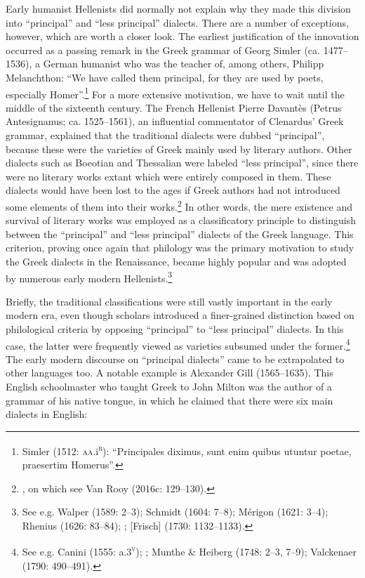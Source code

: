 \documentclass[output=paper]{langsci/langscibook}
\begin{document}
Early humanist Hellenists did normally not explain why they made this division into “principal” and “less principal” dialects. There are a number of exceptions, however, which are worth a closer look. The earliest justification of the innovation occurred as a passing remark in the Greek grammar of Georg Simler (ca. 1477–1536), a German humanist who was the teacher of, among others, Philipp Melanchthon: “We have called them principal, for they are used by poets, especially Homer”.\footnote{Simler (1512: \textsc{aa.}i\textsc{\textsuperscript{r}}): “Principales diximus, sunt enim quibus utuntur poetae, praesertim Homerus”.} For a more extensive motivation, we have to wait until the middle of the sixteenth century. The French Hellenist Pierre Davantès (Petrus Antesignanus; ca. 1525–1561), an influential commentator of Clenardus’ Greek grammar, explained that the traditional dialects were dubbed “principal”, because these were the varieties of Greek mainly used by literary authors. Other dialects such as Boeotian and Thessalian were labeled “less principal”, since there were no literary works extant which were entirely composed in them. These dialects would have been lost to the ages if Greek authors had not introduced some elements of them into their works.\footnote{\citet[11]{Antesignanus1554}, on which see Van Rooy (2016c: 129–130).} In other words, the mere existence and survival of literary works was employed as a classificatory principle to distinguish between the “principal” and “less principal” dialects of the Greek language. This criterion, proving once again that philology was the primary motivation to study the Greek dialects in the Renaissance, became highly popular and was adopted by numerous early modern Hellenists.\footnote{See e.g. Walper (1589: 2–3); Schmidt (1604: 7–8); Mérigon (1621: 3–4); Rhenius (1626: 83–84); \citet[66]{Busby1696}; [Frisch] (1730: 1132–1133).}

Briefly, the traditional classifications were still vastly important in the early modern era, even though scholars introduced a finer-grained distinction based on philological criteria by opposing “principal” to “less principal” dialects. In this case, the latter were frequently viewed as varieties subsumed under the former.\footnote{See e.g. Canini (1555: a.3\textsc{\textsuperscript{v}}); \citet[439]{Saumaise1643a}; Munthe \& Heiberg (1748: 2–3, 7–9); Valckenaer (1790: 490–491).} The early modern discourse on “principal dialects” came to be extrapolated to other languages too. A notable example is Alexander Gill (1565–1635). This English schoolmaster who taught Greek to John Milton was the author of a grammar of his native tongue, in which he claimed that there were six main dialects in English:
\end{document}
